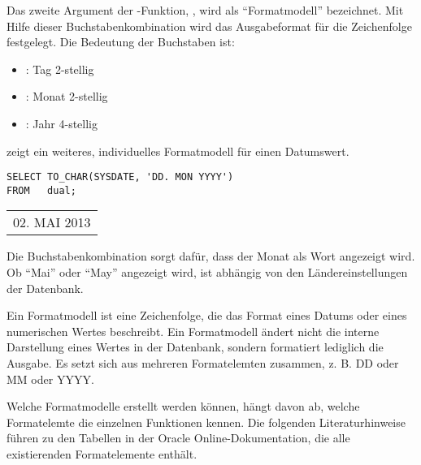 Das zweite Argument der -Funktion, , wird als \enquote{Formatmodell} bezeichnet. Mit Hilfe dieser Buchstabenkombination wird das Ausgabeformat für die Zeichenfolge festgelegt. Die Bedeutung der Buchstaben ist:
\begin{itemize}
    \item {}: Tag 2-stellig
    \item {}: Monat 2-stellig
    \item {}: Jahr 4-stellig
\end{itemize}
 zeigt ein weiteres, individuelles Formatmodell für einen Datumswert.
\begin{lstlisting}[language=oracle_sql,caption={Ein anderes Formatmodell},label=sql03_30]
SELECT TO_CHAR(SYSDATE, 'DD. MON YYYY')
FROM   dual;
          \end{lstlisting}
\begin{center}
    \begin{small}
        \tablehead{}

        \begin{oraclesql}
            \begin{supertabular}{l}
                02. MAI 2013 \\
            \end{supertabular}
        \end{oraclesql}
    \end{small}
\end{center}
Die Buchstabenkombination  sorgt dafür, dass der Monat als Wort angezeigt wird. Ob \enquote{Mai} oder \enquote{May} angezeigt wird, ist abhängig von den Ländereinstellungen der Datenbank.
\begin{merke}
    Ein Formatmodell ist eine Zeichenfolge, die das Format eines Datums oder eines numerischen Wertes beschreibt. Ein Formatmodell ändert nicht die interne Darstellung eines Wertes in der Datenbank, sondern formatiert lediglich die Ausgabe. Es setzt sich aus mehreren Formatelemten zusammen, z. B. DD oder MM oder YYYY.
\end{merke}
Welche Formatmodelle erstellt werden können, hängt davon ab, welche Formatelemte die einzelnen Funktionen kennen. Die folgenden Literaturhinweise führen zu den Tabellen in der Oracle Online-Dokumentation, die alle existierenden Formatelemente enthält.
\begin{literaturinternet}
    \item \cite{i34570}
    \item \cite{i34924}
\end{literaturinternet}

